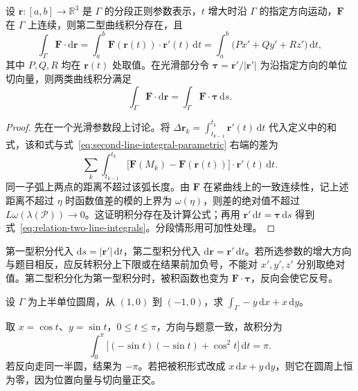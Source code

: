 \documentclass[UTF8,12pt,a4paper,fontset=fandol]{ctexbook}
\begin{document}
\begin{theorem}
\label{thm:second-line-integral-parametric}
设 $\boldsymbol r:[a,b]\to\mathbb R^3$ 是 $\Gamma$ 的分段正则参数表示，$t$ 增大时沿 $\Gamma$ 的指定方向运动，$\boldsymbol F$ 在 $\Gamma$ 上连续，则第二型曲线积分存在，且
\begin{equation}
\label{eq:second-line-integral-parametric}
    \int_\Gamma\boldsymbol F\cdot\mathrm d\boldsymbol r
    =\int_a^b\boldsymbol F(\boldsymbol r(t))\cdot\boldsymbol r'(t)\,\mathrm dt
    =\int_a^b\bigl(Px'+Qy'+Rz'\bigr)\,\mathrm dt,
\end{equation}
其中 $P,Q,R$ 均在 $\boldsymbol r(t)$ 处取值。在光滑部分令 $\boldsymbol\tau=\boldsymbol r'/|\boldsymbol r'|$ 为沿指定方向的单位切向量，则两类曲线积分满足
\begin{equation}
\label{eq:relation-two-line-integrals}
    \int_\Gamma\boldsymbol F\cdot\mathrm d\boldsymbol r
    =\int_\Gamma\boldsymbol F\cdot\boldsymbol\tau\,\mathrm ds.
\end{equation}
\end{theorem}

\begin{proof}
先在一个光滑参数段上讨论。将 $\Delta\boldsymbol r_k=\int_{t_{k-1}}^{t_k}\boldsymbol r'(t)\,\mathrm dt$ 代入定义中的和式，该和式与式~\eqref{eq:second-line-integral-parametric} 右端的差为
\[
    \sum_k\int_{t_{k-1}}^{t_k}
    \bigl[\boldsymbol F(M_k)-\boldsymbol F(\boldsymbol r(t))\bigr]
    \cdot\boldsymbol r'(t)\,\mathrm dt.
\]
同一子弧上两点的距离不超过该弧长度。由 $\boldsymbol F$ 在紧曲线上的一致连续性，记上述距离不超过 $\eta$ 时函数值差的模的上界为 $\omega(\eta)$，则差的绝对值不超过 $L\omega(\lambda(\mathcal P))\to0$。这证明积分存在及计算公式；再用 $\boldsymbol r'\,\mathrm dt=\boldsymbol\tau\,\mathrm ds$ 得到式~\eqref{eq:relation-two-line-integrals}。分段情形用可加性处理。
\end{proof}

\begin{notealert}[type=caution,title={长度微元与有向位移}]
第一型积分代入 $\mathrm ds=|\boldsymbol r'|\,\mathrm dt$，第二型积分代入 $\mathrm d\boldsymbol r=\boldsymbol r'\,\mathrm dt$。若所选参数的增大方向与题目相反，应反转积分上下限或在结果前加负号，不能对 $x',y',z'$ 分别取绝对值。第二型积分化为第一型积分时，被积函数也变为 $\boldsymbol F\cdot\boldsymbol\tau$，反向会使它反号。
\end{notealert}

\begin{example}
\label{ex:second-line-integral-semicircle}
设 $\Gamma$ 为上半单位圆周，从 $(1,0)$ 到 $(-1,0)$，求 $\int_\Gamma-y\,\mathrm dx+x\,\mathrm dy$。
\end{example}
\begin{solve}
取 $x=\cos t$、$y=\sin t$，$0\leq t\leq\pi$，方向与题意一致，故积分为
\[
    \int_0^\pi\bigl[(-\sin t)(-\sin t)+\cos^2t\bigr]\,\mathrm dt=\pi.
\]
若反向走同一半圆，结果为 $-\pi$。若把被积形式改成 $x\,\mathrm dx+y\,\mathrm dy$，则它在圆周上恒为零，因为位置向量与切向量正交。
\end{solve}
\end{document}
